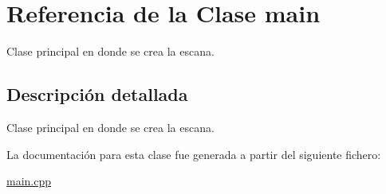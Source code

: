 \hypertarget{classmain}{}\section{Referencia de la Clase main}
\label{classmain}


Clase principal en donde se crea la escana.  




\subsection{Descripción detallada}
Clase principal en donde se crea la escana. 

La documentación para esta clase fue generada a partir del siguiente fichero\+:\begin{DoxyCompactItemize}
\item 
\mbox{\hyperlink{main_8cpp}{main.\+cpp}}\end{DoxyCompactItemize}
